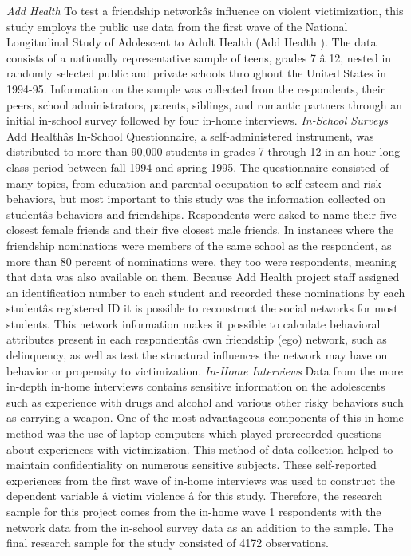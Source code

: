 \documentclass[]{article}
\begin{document}
\emph{Add Health} To test a friendship networkâs influence on violent
victimization, this study employs the public use data from the first
wave of the National Longitudinal Study of Adolescent to Adult Health
(Add Health ). The data consists of a nationally representative sample
of teens, grades 7 â 12, nested in randomly selected public and
private schools throughout the United States in 1994-95. Information on
the sample was collected from the respondents, their peers, school
administrators, parents, siblings, and romantic partners through an
initial in-school survey followed by four in-home interviews.
\emph{In-School Surveys} Add Healthâs In-School Questionnaire, a
self-administered instrument, was distributed to more than 90,000
students in grades 7 through 12 in an hour-long class period between
fall 1994 and spring 1995. The questionnaire consisted of many topics,
from education and parental occupation to self-esteem and risk
behaviors, but most important to this study was the information
collected on studentâs behaviors and friendships. Respondents were
asked to name their five closest female friends and their five closest
male friends. In instances where the friendship nominations were members
of the same school as the respondent, as more than 80 percent of
nominations were, they too were respondents, meaning that data was also
available on them. Because Add Health project staff assigned an
identification number to each student and recorded these nominations by
each studentâs registered ID it is possible to reconstruct the social
networks for most students. This network information makes it possible
to calculate behavioral attributes present in each respondentâs own
friendship (ego) network, such as delinquency, as well as test the
structural influences the network may have on behavior or propensity to
victimization. \emph{In-Home Interviews} Data from the more in-depth
in-home interviews contains sensitive information on the adolescents
such as experience with drugs and alcohol and various other risky
behaviors such as carrying a weapon. One of the most advantageous
components of this in-home method was the use of laptop computers which
played prerecorded questions about experiences with victimization. This
method of data collection helped to maintain confidentiality on numerous
sensitive subjects. These self-reported experiences from the first wave
of in-home interviews was used to construct the dependent variable â
victim violence â for this study. Therefore, the research sample for
this project comes from the in-home wave 1 respondents with the network
data from the in-school survey data as an addition to the sample. The
final research sample for the study consisted of 4172 observations.
\end{document}
